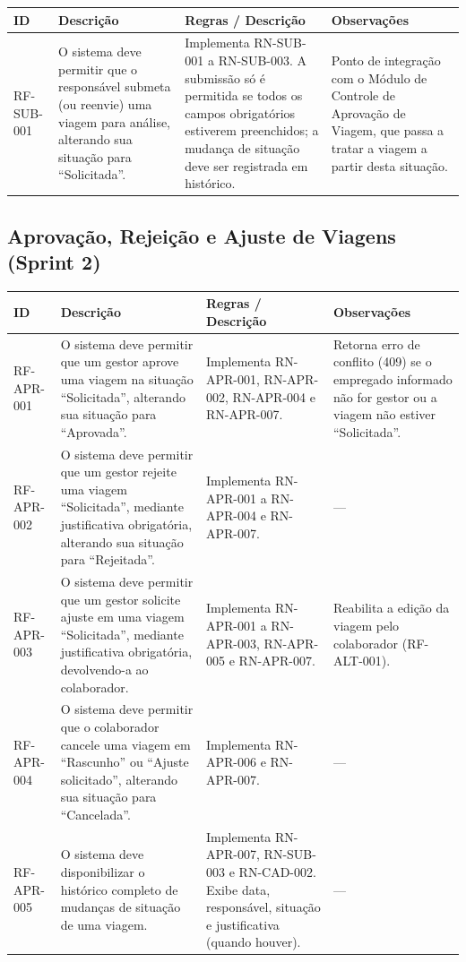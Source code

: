 \documentclass[12pt,article,oneside,a4paper]{abntex2}
\begin{document}
\begin{xltabular}{\textwidth}{|l|Y|Y|Y|}
\hline
{}
\textbf{ID} & \textbf{Descrição} & \textbf{Regras / Descrição} & \textbf{Observações} \\
\hline
\endhead
RF-SUB-001 & O sistema deve permitir que o responsável submeta (ou reenvie) uma viagem para análise, alterando sua situação para ``Solicitada''. & Implementa RN-SUB-001 a RN-SUB-003. A submissão só é permitida se todos os campos obrigatórios estiverem preenchidos; a mudança de situação deve ser registrada em histórico. & Ponto de integração com o Módulo de Controle de Aprovação de Viagem, que passa a tratar a viagem a partir desta situação. \\
\hline
\end{xltabular}

\bigskip

\subsection{Aprovação, Rejeição e Ajuste de Viagens (Sprint 2)}

\begin{xltabular}{\textwidth}{|l|Y|Y|Y|}
\hline
{}
\textbf{ID} & \textbf{Descrição} & \textbf{Regras / Descrição} & \textbf{Observações} \\
\hline
\endhead
RF-APR-001 & O sistema deve permitir que um gestor aprove uma viagem na situação ``Solicitada'', alterando sua situação para ``Aprovada''. & Implementa RN-APR-001, RN-APR-002, RN-APR-004 e RN-APR-007. & Retorna erro de conflito (409) se o empregado informado não for gestor ou a viagem não estiver ``Solicitada''. \\
\hline
RF-APR-002 & O sistema deve permitir que um gestor rejeite uma viagem ``Solicitada'', mediante justificativa obrigatória, alterando sua situação para ``Rejeitada''. & Implementa RN-APR-001 a RN-APR-004 e RN-APR-007. & --- \\
\hline
RF-APR-003 & O sistema deve permitir que um gestor solicite ajuste em uma viagem ``Solicitada'', mediante justificativa obrigatória, devolvendo-a ao colaborador. & Implementa RN-APR-001 a RN-APR-003, RN-APR-005 e RN-APR-007. & Reabilita a edição da viagem pelo colaborador (RF-ALT-001). \\
\hline
RF-APR-004 & O sistema deve permitir que o colaborador cancele uma viagem em ``Rascunho'' ou ``Ajuste solicitado'', alterando sua situação para ``Cancelada''. & Implementa RN-APR-006 e RN-APR-007. & --- \\
\hline
RF-APR-005 & O sistema deve disponibilizar o histórico completo de mudanças de situação de uma viagem. & Implementa RN-APR-007, RN-SUB-003 e RN-CAD-002. Exibe data, responsável, situação e justificativa (quando houver). & --- \\
\hline
\end{xltabular}
\end{document}
